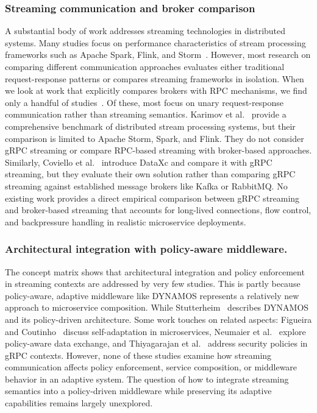 \documentclass[a4paper,10pt,british]{scrartcl}
\begin{document}
\subsubsection{Streaming communication and broker comparison}
A substantial body of work addresses streaming technologies in distributed systems. Many studies focus on performance characteristics of stream processing frameworks such as Apache Spark, Flink, and Storm~\cite{karimov2018benchmarking, fragkoulis2024survey, lote2022realtime}. However, most research on comparing different communication approaches evaluates either traditional request-response patterns or compares streaming frameworks in isolation. When we look at work that explicitly compares brokers with RPC mechanisms, we find only a handful of studies~\cite{ibrahim2026brokers, nuikka2021cloudnative, johansson2020rpc5g, coviello2022dataxc}. Of these, most focus on unary request-response communication rather than streaming semantics. Karimov et al.~\cite{karimov2018benchmarking} provide a comprehensive benchmark of distributed stream processing systems, but their comparison is limited to Apache Storm, Spark, and Flink. They do not consider gRPC streaming or compare RPC-based streaming with broker-based approaches. Similarly, Coviello et al.~\cite{coviello2022dataxc} introduce DataXc and compare it with gRPC streaming, but they evaluate their own solution rather than comparing gRPC streaming against established message brokers like Kafka or RabbitMQ. No existing work provides a direct empirical comparison between gRPC streaming and broker-based streaming that accounts for long-lived connections, flow control, and backpressure handling in realistic microservice deployments.

\subsubsection{Architectural integration with policy-aware middleware.}
The concept matrix shows that architectural integration and policy enforcement in streaming contexts are addressed by very few studies. This is partly because policy-aware, adaptive middleware like DYNAMOS represents a relatively new approach to microservice composition. While Stutterheim~\cite{stutterheim2023thesis, stutterheim2023icsa} describes DYNAMOS and its policy-driven architecture. Some work touches on related aspects: Figueira and Coutinho~\cite{figueira2024selfadaptive} discuss self-adaptation in microservices, Neumaier et al.~\cite{neumaier2021policyaware} explore policy-aware data exchange, and Thiyagarajan et al.~\cite{thiyagarajan2025grpcsecurity} address security policies in gRPC contexts. However, none of these studies examine how streaming communication affects policy enforcement, service composition, or middleware behavior in an adaptive system. The question of how to integrate streaming semantics into a policy-driven middleware while preserving its adaptive capabilities remains largely unexplored.
\end{document}
